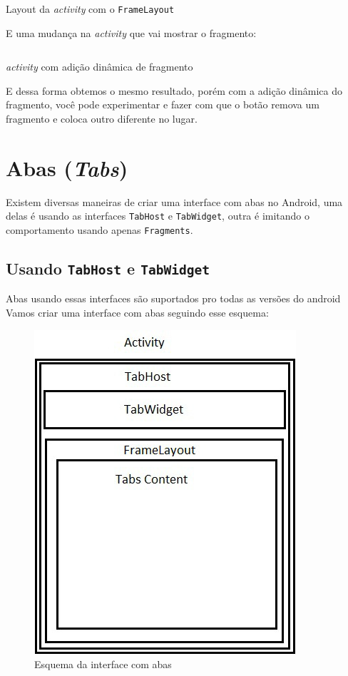 \documentclass[a4paper,12pt,brazil,doubleside]{book}
\begin{document}
\begin{singlespace}
\begin{listing}[H]
\inputminted[linenos=true,fontsize=\small,frame=lines, framesep=2mm, tabsize=2,numbersep=5pt]{xml}{src/design/framelayout.xml}
\caption{Layout da \emph{activity} com o \texttt{FrameLayout}}
\end{listing}	

E uma mudança na \emph{activity} que vai mostrar o fragmento:

\begin{listing}[H]
\inputminted[linenos=true,fontsize=\small,frame=lines, framesep=2mm, tabsize=2,numbersep=5pt]{java}{src/design/activity-frag-dyn.java}
\caption{\emph{activity} com adição dinâmica de fragmento}
\end{listing}	

E dessa forma obtemos o mesmo resultado, porém com a adição dinâmica do fragmento, você pode experimentar e fazer com que o botão remova um fragmento e coloca outro diferente no lugar.


\section{Abas (\emph{Tabs})}
	Existem diversas maneiras de criar uma interface com abas no Android, uma delas é usando as interfaces \texttt{TabHost} e \texttt{TabWidget}, outra é imitando o comportamento usando apenas \texttt{Fragments}. 

	\subsection{Usando \texttt{TabHost} e \texttt{TabWidget}}
	
	Abas usando essas interfaces são suportados pro todas as versões do android	
	Vamos criar uma interface com abas seguindo esse esquema:
	
	\begin{figure}[H]
	  \centering
	  \includegraphics[width=.475\textwidth]{figuras/design/tabs1.jpg}
	  \caption{Esquema da interface com abas}
	  \label{fig:e}
	\end{figure}
	

\end{singlespace}
\end{document}
